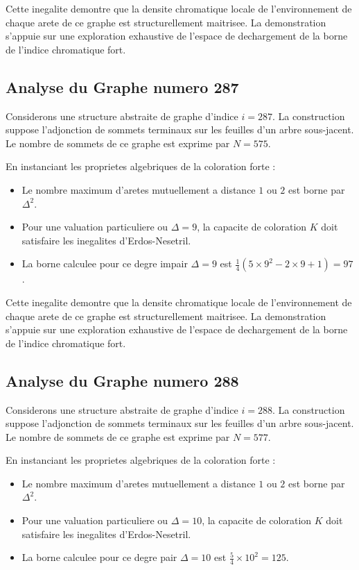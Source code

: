 \documentclass[11pt,a4paper]{article}
\begin{document}
Cette inegalite demontre que la densite chromatique locale de l'environnement de chaque arete de ce graphe est structurellement maitrisee. La demonstration s'appuie sur une exploration exhaustive de l'espace de dechargement de la borne de l'indice chromatique fort.

\subsection{Analyse du Graphe numero 287}
Considerons une structure abstraite de graphe d'indice $i = 287$. La construction suppose l'adjonction de sommets terminaux sur les feuilles d'un arbre sous-jacent. Le nombre de sommets de ce graphe est exprime par $N = 575$.

En instanciant les proprietes algebriques de la coloration forte :
\begin{itemize}
\item Le nombre maximum d'aretes mutuellement a distance $1$ ou $2$ est borne par $\Delta^2$.
\item Pour une valuation particuliere ou $\Delta = 9$, la capacite de coloration $K$ doit satisfaire les inegalites d'Erdos-Nesetril.
\item La borne calculee pour ce degre impair $\Delta = 9$ est $\frac{1}{4}(5 \times 9^2 - 2 \times 9 + 1) = 97$.
\end{itemize}

Cette inegalite demontre que la densite chromatique locale de l'environnement de chaque arete de ce graphe est structurellement maitrisee. La demonstration s'appuie sur une exploration exhaustive de l'espace de dechargement de la borne de l'indice chromatique fort.

\subsection{Analyse du Graphe numero 288}
Considerons une structure abstraite de graphe d'indice $i = 288$. La construction suppose l'adjonction de sommets terminaux sur les feuilles d'un arbre sous-jacent. Le nombre de sommets de ce graphe est exprime par $N = 577$.

En instanciant les proprietes algebriques de la coloration forte :
\begin{itemize}
\item Le nombre maximum d'aretes mutuellement a distance $1$ ou $2$ est borne par $\Delta^2$.
\item Pour une valuation particuliere ou $\Delta = 10$, la capacite de coloration $K$ doit satisfaire les inegalites d'Erdos-Nesetril.
\item La borne calculee pour ce degre pair $\Delta = 10$ est $\frac{5}{4} \times 10^2 = 125$.
\end{itemize}
\end{document}
